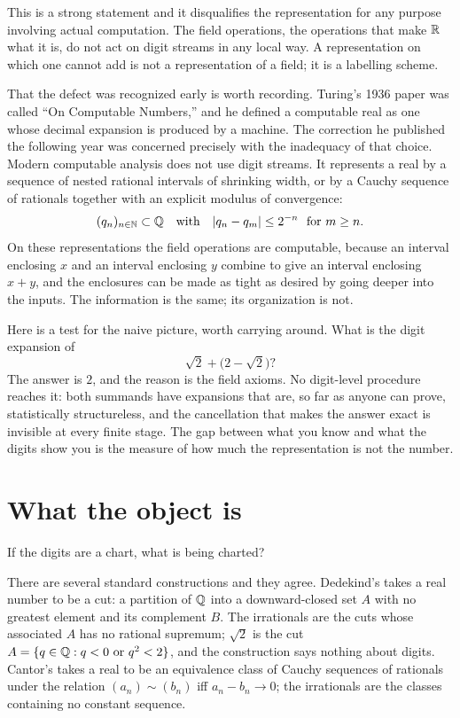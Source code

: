 \documentclass{essay}
\begin{document}
This is a strong statement and it disqualifies the representation for any
purpose involving actual computation. The field operations, the operations that
make \(\mathbb{R}\) what it is, do not act on digit streams in any local way. A
representation on which one cannot add is not a representation of a field; it
is a labelling scheme.

That the defect was recognized early is worth recording. Turing's 1936 paper
was called ``On Computable Numbers,'' and he defined a computable real as one
whose decimal expansion is produced by a machine. The correction he published
the following year was concerned precisely with the inadequacy of that choice.
Modern computable analysis does not use digit streams. It represents a real by
a sequence of nested rational intervals of shrinking width, or by a Cauchy
sequence of rationals together with an explicit modulus of convergence:
\[ (q_{n})_{n \in \mathbb{N}} \subset \mathbb{Q} \quad \text{with} \quad |q_{n} - q_{m}| \le 2^{-n} \ \text{ for } m \ge n . \]
On these representations the field operations are computable, because an
interval enclosing \(x\) and an interval enclosing \(y\) combine to give an
interval enclosing \(x+y\), and the enclosures can be made as tight as desired by
going deeper into the inputs. The information is the same; its organization is
not.

Here is a test for the naive picture, worth carrying around. What is the digit
expansion of
\[ \sqrt{2} + \bigl(2 - \sqrt{2}\bigr) ? \]
The answer is \(2\), and the reason is the field axioms. No digit-level procedure
reaches it: both summands have expansions that are, so far as anyone can prove,
statistically structureless, and the cancellation that makes the answer exact
is invisible at every finite stage. The gap between what you know and what the
digits show you is the measure of how much the representation is not the
number.

\section{What the object is}

If the digits are a chart, what is being charted?

There are several standard constructions and they agree. Dedekind's takes a
real number to be a cut: a partition of \(\mathbb{Q}\) into a downward-closed set \(A\)
with no greatest element and its complement \(B\). The irrationals are the cuts
whose associated \(A\) has no rational supremum; \(\sqrt{2}\) is the cut
\(A = \{q \in \mathbb{Q} : q < 0 \text{ or } q^{2} < 2\}\), and the construction says
nothing about digits. Cantor's takes a real to be an equivalence class of
Cauchy sequences of rationals under the relation \((a_{n}) \sim (b_{n})\) iff
\(a_{n} - b_{n} \to 0\); the irrationals are the classes containing no constant
sequence.
\end{document}

